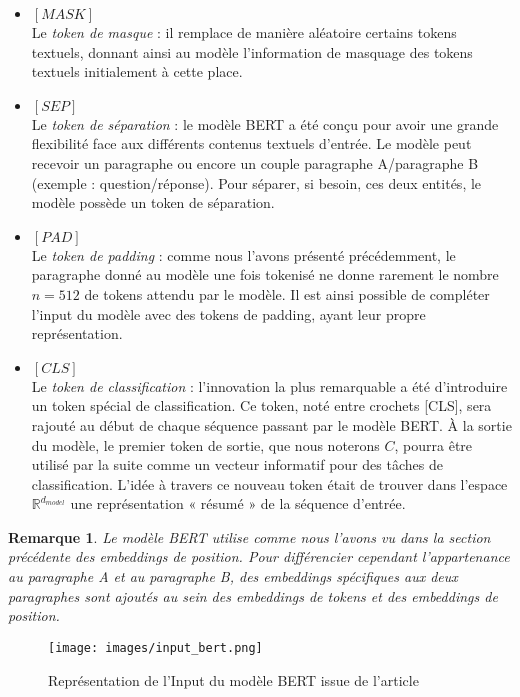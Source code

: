 \documentclass[12pt]{article}
\newtheorem{rmq}{Remarque}
\theoremstyle{definition}
\begin{document}
\begin{itemize}[$ $]
	\item  $[MASK]$ \\
	
	Le \textit{token de masque} : il remplace de manière aléatoire certains tokens textuels, donnant ainsi au modèle l’information de masquage des tokens textuels initialement à cette place.\\
	
	\item  $[SEP]$\\
	
	Le \textit{token de séparation} : le modèle BERT a été conçu pour avoir une grande flexibilité face aux différents contenus textuels d’entrée. Le modèle peut recevoir un paragraphe ou encore un couple paragraphe A/paragraphe B (exemple : question/réponse). Pour séparer, si besoin, ces deux entités, le modèle possède un token de séparation.\\
	
	\item  $[PAD]$\\
	
	Le \textit{token de padding} : comme nous l’avons présenté précédemment, le paragraphe donné au modèle une fois tokenisé ne donne rarement le nombre $n=512$ de tokens attendu par le modèle. Il est ainsi possible de compléter l’input du modèle avec des tokens de padding, ayant leur propre représentation.\\
	
	\item  $[CLS]$\\
	
	Le \textit{token de classification} : l'innovation la plus remarquable a été d'introduire un token spécial de classification. Ce token, noté entre crochets [CLS], sera rajouté au début de chaque séquence passant par le modèle BERT. À la sortie du modèle, le premier token de sortie, que nous noterons $C$, pourra être utilisé par la suite comme un vecteur informatif pour des tâches de classification. L’idée à travers ce nouveau token était de trouver dans l’espace $\mathbb{R}^{d_{model}}$ une représentation « résumé » de la séquence d’entrée.\\	
\end{itemize}

\begin{rmq}
	Le modèle BERT utilise comme nous l’avons vu dans la section précédente des embeddings de position. Pour différencier cependant l’appartenance au paragraphe A et au paragraphe B, des embeddings spécifiques aux deux paragraphes sont ajoutés au sein des embeddings de tokens et des embeddings de position.
	
\end{rmq}
 \newpage
 \begin{figure*}[!h]
 	\centering
 	\texttt{[image: images/input\_bert.png]}
 	\caption{Représentation de l'Input du modèle BERT issue de l'article \cite{bert_paper}}
 \end{figure*}
\end{document}
